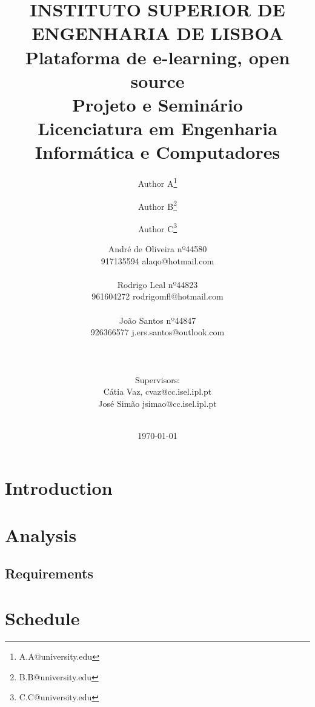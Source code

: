 \documentclass[12pt,a4paper]{article}
\def\paperid{\hfill}
\begin{document}
\title{\vskip-1.45cm
\hskip-13cm  {\small {\vskip-1.45cm{\hskip2.8cm\textbf{INSTITUTO SUPERIOR DE ENGENHARIA DE LISBOA}}}}
\vskip1.45cm
{\bf Plataforma de e-learning, open source} \\[3ex]
{\small Projeto e Seminário\\[-1ex]
 Licenciatura em Engenharia Informática e Computadores}
}
\author[1]{Author A\thanks{A.A@university.edu}}
\author[1]{Author B\thanks{B.B@university.edu}}
\author[1]{Author C\thanks{C.C@university.edu}}

\author{ André de Oliveira nº44580
\\[1ex]
917135594 alaqo@hotmail.com
\\
\\
 Rodrigo Leal nº44823
 \\[1ex]
 961604272 rodrigomfl@hotmail.com
 \\
 \\
 João Santos nº44847
  \\[1ex]
926366577 j.ers.santos@outlook.com 
\\
\noindent\rule{\textwidth}{1pt}
\\
Supervisors:
\\
Cátia Vaz, cvaz@cc.isel.ipl.pt
\\
José Simão jsimao@cc.isel.ipl.pt
\\
\noindent\rule{\textwidth}{1pt}
}

\date{\small\today}
\maketitle
\def\paperid{\hfill}

\section{Introduction}\label{section:primeiraSec}


\section{Analysis}

\subsection{Requirements}


\section{Schedule}







\end{document}
